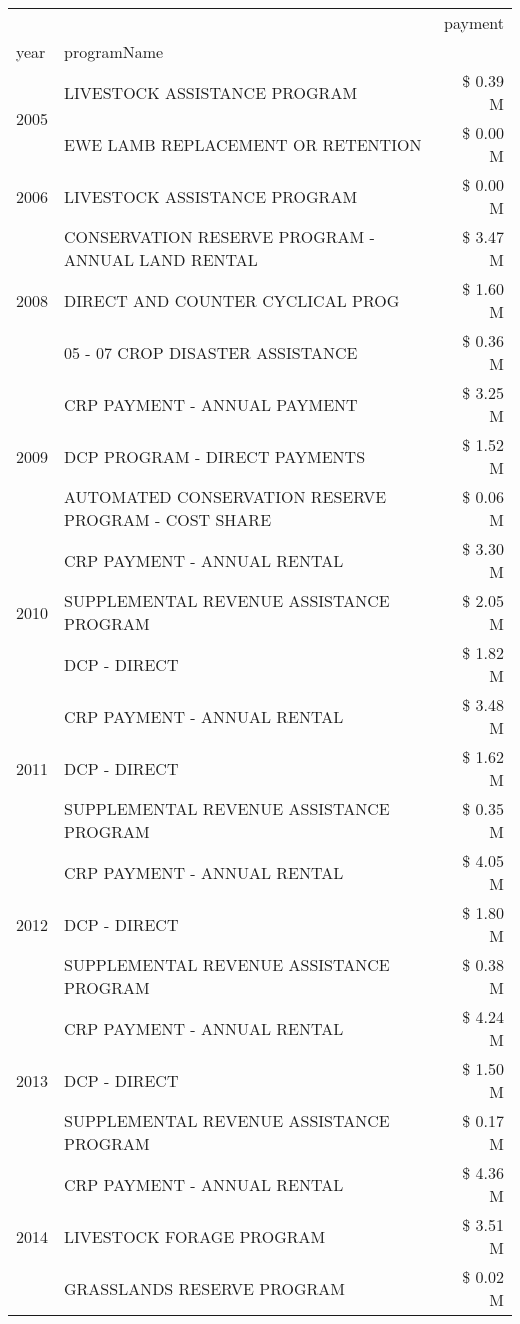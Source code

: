 \begin{tabular}{llr}
\toprule
 &  & payment \\
year & programName &  \\
\midrule
\multirow[t]{2}{*}{2005} & LIVESTOCK ASSISTANCE PROGRAM & \$ 0.39 M \\
 & EWE LAMB REPLACEMENT OR RETENTION & \$ 0.00 M \\
\cline{1-3}
2006 & LIVESTOCK ASSISTANCE PROGRAM & \$ 0.00 M \\
\cline{1-3}
\multirow[t]{3}{*}{2008} & CONSERVATION RESERVE PROGRAM - ANNUAL LAND RENTAL & \$ 3.47 M \\
 & DIRECT AND COUNTER CYCLICAL PROG & \$ 1.60 M \\
 & 05 - 07 CROP DISASTER ASSISTANCE & \$ 0.36 M \\
\cline{1-3}
\multirow[t]{3}{*}{2009} & CRP PAYMENT - ANNUAL PAYMENT & \$ 3.25 M \\
 & DCP PROGRAM - DIRECT PAYMENTS & \$ 1.52 M \\
 & AUTOMATED CONSERVATION RESERVE PROGRAM - COST SHARE & \$ 0.06 M \\
\cline{1-3}
\multirow[t]{3}{*}{2010} & CRP PAYMENT - ANNUAL RENTAL & \$ 3.30 M \\
 & SUPPLEMENTAL REVENUE ASSISTANCE PROGRAM & \$ 2.05 M \\
 & DCP - DIRECT & \$ 1.82 M \\
\cline{1-3}
\multirow[t]{3}{*}{2011} & CRP PAYMENT - ANNUAL RENTAL & \$ 3.48 M \\
 & DCP - DIRECT & \$ 1.62 M \\
 & SUPPLEMENTAL REVENUE ASSISTANCE PROGRAM & \$ 0.35 M \\
\cline{1-3}
\multirow[t]{3}{*}{2012} & CRP PAYMENT - ANNUAL RENTAL & \$ 4.05 M \\
 & DCP - DIRECT & \$ 1.80 M \\
 & SUPPLEMENTAL REVENUE ASSISTANCE PROGRAM & \$ 0.38 M \\
\cline{1-3}
\multirow[t]{3}{*}{2013} & CRP PAYMENT - ANNUAL RENTAL & \$ 4.24 M \\
 & DCP - DIRECT & \$ 1.50 M \\
 & SUPPLEMENTAL REVENUE ASSISTANCE PROGRAM & \$ 0.17 M \\
\cline{1-3}
\multirow[t]{3}{*}{2014} & CRP PAYMENT - ANNUAL RENTAL & \$ 4.36 M \\
 & LIVESTOCK FORAGE PROGRAM & \$ 3.51 M \\
 & GRASSLANDS RESERVE PROGRAM & \$ 0.02 M \\

\end{tabular}
